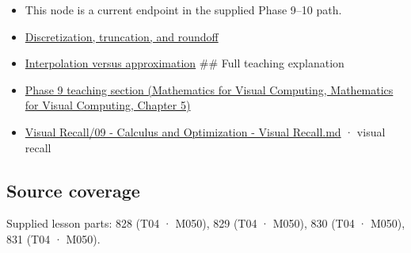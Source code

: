 \begin{itemize}
\item
  This node is a current endpoint in the supplied Phase 9--10 path.
\item
  \hyperref[appendix-6b0648b2b8e8]{Discretization, truncation, and roundoff}
\item
  \hyperref[appendix-0c2a5f69851e]{Interpolation versus approximation} \#\# Full teaching explanation
\item
  \href{../02-Mathematics-for-Visual-Computing/main.pdf\#nameddest=02-foundations-ii-ch021-jacobians-curvature-and-local-approximation}{Phase 9 teaching section (Mathematics for Visual Computing, Mathematics for Visual Computing, Chapter 5)}
\item
  \hyperref[appendix-adf48f5dc5c1]{Visual Recall/09 - Calculus and Optimization - Visual Recall.md} · visual recall
\end{itemize}

\subsection{Source coverage}\label{appendix-32f39e9a3738-source-coverage}

Supplied lesson parts: 828 (T04 · M050), 829 (T04 · M050), 830 (T04 · M050), 831 (T04 · M050).
